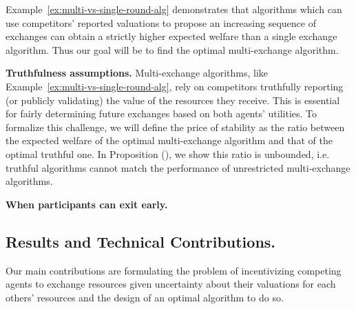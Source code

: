 Example~\ref{ex:multi-vs-single-round-alg} demonstrates that algorithms which can use competitors'
reported valuations to propose an increasing sequence of exchanges can obtain a strictly higher
expected welfare than a single exchange algorithm. Thus our goal will be to find the
optimal multi-exchange algorithm.

\textbf{Truthfulness assumptions.}
Multi-exchange algorithms, like Example~\ref{ex:multi-vs-single-round-alg}, rely on competitors truthfully 
reporting (or publicly validating) the value of the resources they receive. This is essential for 
fairly determining future exchanges based on both agents' utilities. To formalize this challenge, 
we will define the price of stability as the ratio between the expected welfare of the optimal 
multi-exchange algorithm and that of the optimal truthful one. 
In Proposition (), we show this ratio is unbounded, i.e. truthful algorithms cannot 
match the performance of unrestricted multi-exchange algorithms.




\textbf{When participants can exit early.}


\subsection{Results and Technical Contributions.}
Our main contributions are formulating the problem of incentivizing competing agents to exchange resources
given uncertainty about their valuations for each others' resources and the design of an optimal 
algorithm to do so.

